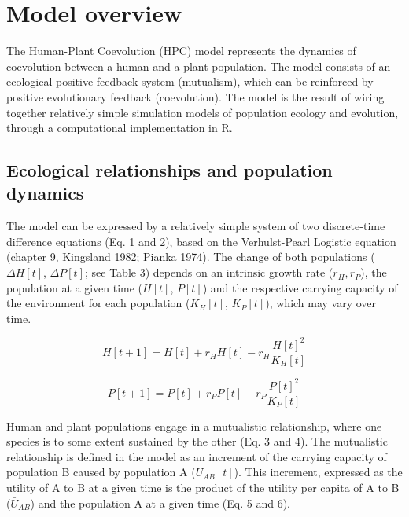 \documentclass[
]{book}
\begin{document}
\hypertarget{model-overview}{%
\chapter*{Model overview}\label{model-overview}}

The Human-Plant Coevolution (HPC) model represents the dynamics of coevolution between a human and a plant population. The model consists of an ecological positive feedback system (mutualism), which can be reinforced by positive evolutionary feedback (coevolution). The model is the result of wiring together relatively simple simulation models of population ecology and evolution, through a computational implementation in R.

\newpage

\hypertarget{ecological-relationships-and-population-dynamics}{%
\section*{Ecological relationships and population dynamics}\label{ecological-relationships-and-population-dynamics}}

The model can be expressed by a relatively simple system of two discrete-time difference equations (Eq. 1 and 2), based on the Verhulst-Pearl Logistic equation (chapter 9, Kingsland 1982; Pianka 1974). The change of both populations (\(\Delta H[t]\), \(\Delta P[t]\); see Table 3) depends on an intrinsic growth rate (\(r_{H}, r_{P}\)), the population at a given time (\(H[t]\), \(P[t]\)) and the respective carrying capacity of the environment for each population (\(K_{H}[t]\), \(K_{P}[t]\)), which may vary over time.

\begin{equation}
\tag{Eq. 1}
H[t+1]=H[t]+r_{H}H[t]-r_{H}\frac{H[t]^{2}}{K_{H}[t]}
\end{equation}

\begin{equation}
\tag{Eq. 2}
P[t+1]=P[t]+r_{P}P[t]-r_{P}\frac{P[t]^{2}}{K_{P}[t]}
\end{equation}

Human and plant populations engage in a mutualistic relationship, where one species is to some extent sustained by the other (Eq. 3 and 4). The mutualistic relationship is defined in the model as an increment of the carrying capacity of population B caused by population A (\(U_{AB}[t]\)). This increment, expressed as the utility of A to B at a given time is the product of the utility per capita of A to B (\(\bar{U}_{AB}\)) and the population A at a given time (Eq. 5 and 6).
\end{document}
